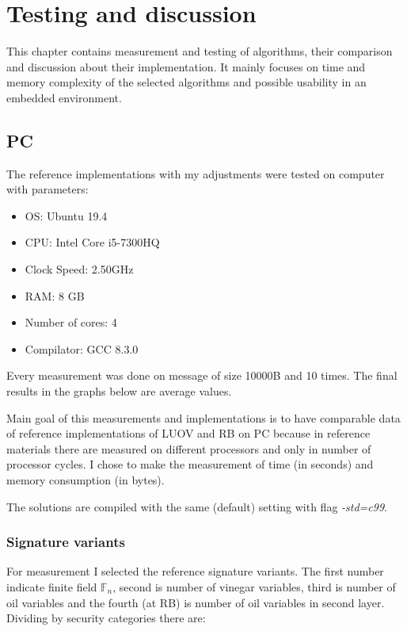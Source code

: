 \documentclass[thesis=M,english]{FITthesis}[2019/12/23]
\begin{document}
\chapter{Testing and discussion} \label{test-and-disk}
This chapter contains measurement and testing of algorithms, their comparison and discussion about their implementation. It mainly focuses on time and memory complexity of the selected algorithms and possible usability in an embedded environment.

\section{PC}
The reference implementations with my adjustments were tested on computer with parameters:
\begin{itemize}
\item OS: Ubuntu 19.4
\item CPU: Intel Core i5-7300HQ
\item Clock Speed: 2.50GHz
\item RAM: 8 GB
\item Number of cores: 4
\item Compilator: GCC 8.3.0
\end{itemize}

\bigskip
\noindent
Every measurement was done on message of size 10000B and 10 times. The final results in the graphs below are average values.

\bigskip
\noindent
Main goal of this measurements and implementations is to have comparable data of reference implementations of LUOV and RB on PC because in reference materials there are measured on different processors and only in number of processor cycles. I chose to make the measurement of time (in seconds) and memory consumption (in bytes).

\bigskip
\noindent
The solutions are compiled with the same (default) setting with flag \textit{-std=c99}.

\subsection{Signature variants}
For measurement I selected the reference signature variants. The first number indicate finite field $\mathbb{F}_{n}$, second is number of vinegar variables, third is number of oil variables and the fourth (at RB) is number of oil variables in second layer. Dividing by security categories there are:
\end{document}
